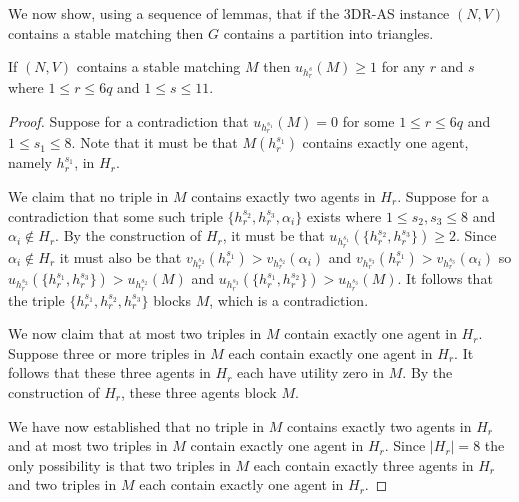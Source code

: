 We now show, using a sequence of lemmas, that if the 3DR-AS instance $(N, V)$ contains a stable matching then $G$ contains a partition into triangles.

\begin{lem}
\label{lem:threed_sr_as_symmetric_ternary_no_hendecagadget_scores_0}
If $(N, V)$ contains a stable matching $M$ then $u_{h_r^s}(M)\geq 1$ for any $r$ and $s$ where $1\leq r\leq 6q$ and $1\leq s\leq 11$.
\end{lem}
\begin{proof}
Suppose for a contradiction that $u_{h_r^{s_1}}(M)=0$ for some $1\leq r\leq 6q$ and $1\leq {s_1} \leq 8$. Note that it must be that $M(h_r^{s_1})$ contains exactly one agent, namely $h_r^{s_1}$, in $H_r$.

We claim that no triple in $M$ contains exactly two agents in $H_r$. Suppose for a contradiction that some such triple $\{ h_r^{s_2}, h_r^{s_3}, \alpha_i \}$ exists where $1\leq s_2, s_3 \leq 8$ and $\alpha_i \notin H_r$. By the construction of $H_r$, it must be that $u_{h_r^{s_1}}(\{ h_r^{s_2}, h_r^{s_3} \})\geq 2$. Since $\alpha_i \notin H_r$ it must also be that $v_{h_r^{s_2}}(h_r^{s_1}) > v_{h_r^{s_2}}(\alpha_i)$ and $v_{h_r^{s_3}}(h_r^{s_1}) > v_{h_r^{s_3}}(\alpha_i)$ so $u_{h_r^{s_2}}(\{ h_r^{s_1}, h_r^{s_3} \}) > u_{h_r^{s_2}}(M)$ and $u_{h_r^{s_3}}(\{ h_r^{s_1}, h_r^{s_2} \}) > u_{h_r^{s_3}}(M)$. It follows that the triple $\{ h_r^{s_1}, h_r^{s_2}, h_r^{s_3} \}$ blocks $M$, which is a contradiction.

We now claim that at most two triples in $M$ contain exactly one agent in $H_r$. Suppose three or more triples in $M$ each contain exactly one agent in $H_r$. It follows that these three agents in $H_r$ each have utility zero in $M$. By the construction of $H_r$, these three agents block $M$.

We have now established that no triple in $M$ contains exactly two agents in $H_r$ and at most two triples in $M$ contain exactly one agent in $H_r$. Since $|H_r|=8$ the only possibility is that two triples in $M$ each contain exactly three agents in $H_r$ and two triples in $M$ each contain exactly one agent in $H_r$.


\end{proof}
